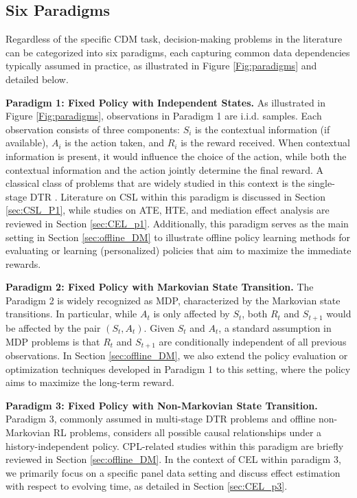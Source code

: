 \subsection{Six Paradigms}\label{sec:paradigms}
Regardless of the specific \acrshort{CDM} task, decision-making problems in the literature can be categorized into six paradigms, each capturing common data dependencies typically assumed in practice, as illustrated in Figure \ref{Fig:paradigms} and detailed below.

\textbf{Paradigm 1: Fixed Policy with Independent States.}
As illustrated in Figure \ref{Fig:paradigms}, observations in Paradigm 1 are i.i.d. samples. Each observation consists of three components: $S_i$ is the contextual information (if available), $A_i$ is the action taken, and $R_i$ is the reward received. When contextual information is present, it would influence the choice of the action, while both the contextual information and the action jointly determine the final reward. A classical class of problems that are widely studied in this context is the single-stage \acrshort{DTR} \citep{tsiatis2019dynamic}. Literature on \acrshort{CSL} within this paradigm is discussed in Section \ref{sec:CSL_P1}, while studies on \acrshort{ATE}, \acrshort{HTE}, and mediation effect analysis are reviewed in Section \ref{sec:CEL_p1}. Additionally, this paradigm serves as the main setting in Section \ref{sec:offline_DM} to illustrate offline policy learning methods for evaluating or learning (personalized) policies that aim to maximize the immediate rewards. 

\textbf{Paradigm 2: Fixed Policy with Markovian State Transition.}
The Paradigm 2 is widely recognized as \acrfull{MDP}, characterized by the Markovian state transitions. In particular, while $A_t$ is only affected by $S_t$, both $R_t$ and $S_{t+1}$ would be affected by the pair $(S_t,A_t)$. Given $S_{t}$ and $A_t$, a standard assumption in \acrshort{MDP} problems is that $R_t$ and $S_{t+1}$ are conditionally independent of all previous observations. In Section
\ref{sec:offline_DM}, we also extend the policy evaluation or optimization techniques developed in Paradigm 1 to this setting, where the policy aims to maximize the long-term reward. 

\textbf{Paradigm 3: Fixed Policy with Non-Markovian State Transition.}
Paradigm 3, commonly assumed in multi-stage \acrshort{DTR} problems \citep{tsiatis2019dynamic} and offline non-Markovian \acrshort{RL} problems, considers all possible causal relationships under a history-independent policy. \acrshort{CPL}-related studies within this paradigm are briefly reviewed in Section \ref{sec:offline_DM}. In the context of \acrshort{CEL} within paradigm 3, we primarily focus on a specific panel data setting and discuss effect estimation with respect to evolving time, as detailed in Section \ref{sec:CEL_p3}. 


